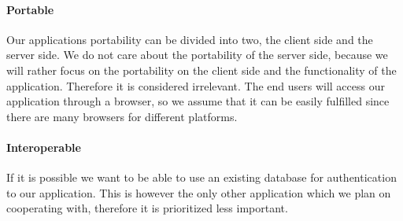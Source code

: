 \paragraph{Portable}
Our applications portability can be divided into two, the client side and the server side.
We do not care about the portability of the server side, because we will rather focus on the portability on the client side and the functionality of the application.
Therefore it is considered irrelevant.
The end users will access our application through a browser, so we assume that it can be easily fulfilled since there are many browsers for different platforms. \cite{chrome10}\cite{firefox}
\paragraph{Interoperable}
If it is possible we want to be able to use an existing database for authentication to our application.
This is however the only other application which we plan on cooperating with, therefore it is prioritized less important.